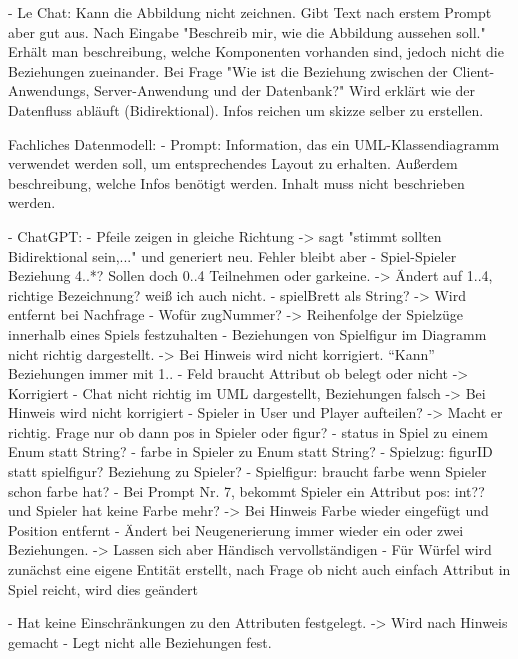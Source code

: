 - Le Chat: Kann die Abbildung nicht zeichnen. Gibt Text nach erstem Prompt aber gut aus. Nach Eingabe "Beschreib mir, 
wie die Abbildung aussehen soll." Erhält man beschreibung, welche Komponenten vorhanden sind, jedoch nicht die 
Beziehungen zueinander. Bei Frage "Wie ist die Beziehung zwischen der Client-Anwendungs, Server-Anwendung und der 
Datenbank?" Wird erklärt wie der Datenfluss abläuft (Bidirektional). Infos reichen um skizze selber zu erstellen.


Fachliches Datenmodell:
- Prompt: Information, das ein UML-Klassendiagramm verwendet werden soll, um entsprechendes Layout zu erhalten. 
Außerdem beschreibung, welche Infos benötigt werden. Inhalt muss nicht beschrieben werden.

- ChatGPT: 
    - Pfeile zeigen in gleiche Richtung -> sagt "stimmt sollten Bidirektional sein,..." und generiert neu. Fehler bleibt aber
    - Spiel-Spieler Beziehung 4..*? Sollen doch 0..4 Teilnehmen oder garkeine. -> Ändert auf 1..4, richtige Bezeichnung? weiß ich auch nicht.
    - spielBrett als String? -> Wird entfernt bei Nachfrage
    - Wofür zugNummer? -> Reihenfolge der Spielzüge innerhalb eines Spiels festzuhalten
    - Beziehungen von Spielfigur im Diagramm nicht richtig dargestellt. -> Bei Hinweis wird nicht korrigiert. ``Kann'' Beziehungen immer mit 1..
    - Feld braucht Attribut ob belegt oder nicht -> Korrigiert
    - Chat nicht richtig im UML dargestellt, Beziehungen falsch -> Bei Hinweis wird nicht korrigiert
    - Spieler in User und Player aufteilen? -> Macht er richtig. Frage nur ob dann pos in Spieler oder figur?
    - status in Spiel zu einem Enum statt String?
    - farbe in Spieler zu Enum statt String?
    - Spielzug: figurID statt spielfigur? Beziehung zu Spieler?
    - Spielfigur: braucht farbe wenn Spieler schon farbe hat?
    - Bei Prompt Nr. 7, bekommt Spieler ein Attribut pos: int?? und Spieler hat keine Farbe mehr? -> Bei Hinweis Farbe wieder eingefügt und Position entfernt
    - Ändert bei Neugenerierung immer wieder ein oder zwei Beziehungen. -> Lassen sich aber Händisch vervollständigen
    - Für Würfel wird zunächst eine eigene Entität erstellt, nach Frage ob nicht auch einfach Attribut in Spiel reicht, wird dies geändert

    - Hat keine Einschränkungen zu den Attributen festgelegt. -> Wird nach Hinweis gemacht
    - Legt nicht alle Beziehungen fest.

